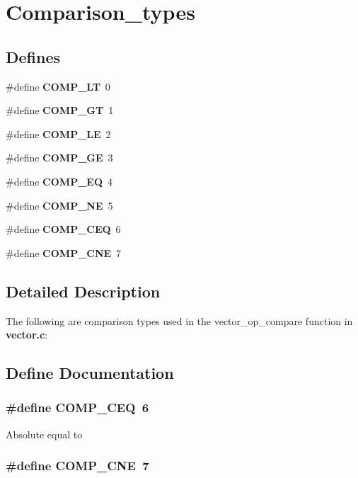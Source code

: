 \section{Comparison\_\-types}
\label{group__comparison__types}
\subsection*{Defines}
\begin{CompactItemize}
\item 
\#define {\bf COMP\_\-LT}\ 0
\item 
\#define {\bf COMP\_\-GT}\ 1
\item 
\#define {\bf COMP\_\-LE}\ 2
\item 
\#define {\bf COMP\_\-GE}\ 3
\item 
\#define {\bf COMP\_\-EQ}\ 4
\item 
\#define {\bf COMP\_\-NE}\ 5
\item 
\#define {\bf COMP\_\-CEQ}\ 6
\item 
\#define {\bf COMP\_\-CNE}\ 7
\end{CompactItemize}


\subsection{Detailed Description}
The following are comparison types used in the vector\_\-op\_\-compare function in {\bf vector.c}: 

\subsection{Define Documentation}
\subsubsection{\setlength{\rightskip}{0pt plus 5cm}\#define COMP\_\-CEQ\ 6}\label{group__comparison__types_a6}


Absolute equal to 
\subsubsection{\setlength{\rightskip}{0pt plus 5cm}\#define COMP\_\-CNE\ 7}\label{group__comparison__types_a7}


